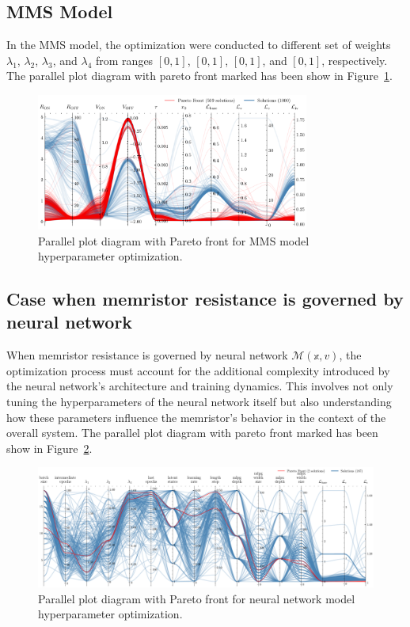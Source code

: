 \documentclass[11pt, oneside]{article}
\begin{document}
\subsection{MMS Model}

In the MMS model, the optimization were conducted to different set of weights $\lambda_1$, $\lambda_2$, $\lambda_3$, and $\lambda_4$ from ranges $[0, 1]$, $[0, 1]$, $[0, 1]$, and $[0, 1]$, respectively. The parallel plot diagram with pareto front marked has been show in Figure~\ref{fig:mms_hyperparameter_optimization}.


\begin{figure}[H]
    \centering
    \includegraphics[width=0.8\textwidth]{mms_figs/parallel_coordinates_plot.pdf}
    \caption{Parallel plot diagram with Pareto front for MMS model hyperparameter optimization.}
    \label{fig:mms_hyperparameter_optimization}
\end{figure}


\subsection{Case when memristor resistance is governed by neural network}

When memristor resistance is governed by neural network $\mathcal{M}(\mathbb{x}, v)$, the optimization process must account for the additional complexity introduced by the neural network's architecture and training dynamics. This involves not only tuning the hyperparameters of the neural network itself but also understanding how these parameters influence the memristor's behavior in the context of the overall system. The parallel plot diagram with pareto front marked has been show in Figure~\ref{fig:nn_hyperparameter_optimization}.

\begin{figure}[H]
    \centering
    \includegraphics[width=\textwidth]{mms_figs/parallel_coordinates_plot_full.pdf}
    \caption{Parallel plot diagram with Pareto front for neural network model hyperparameter optimization.}
    \label{fig:nn_hyperparameter_optimization}
\end{figure}
\end{document}
